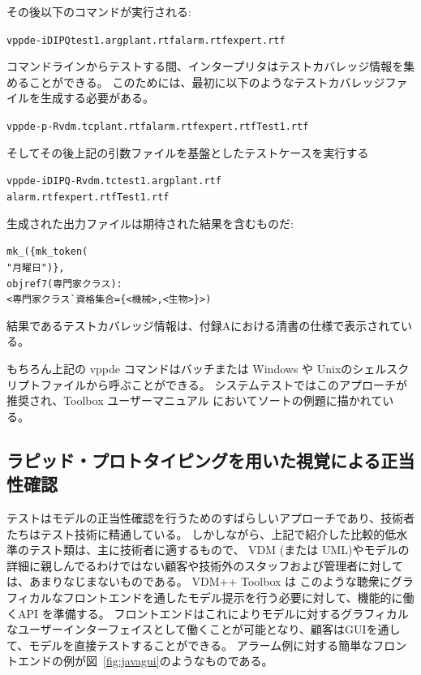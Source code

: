 \documentclass[\pformat,12pt,twoside]{jarticle}
\begin{document}
その後以下のコマンドが実行される: 

\small
\begin{alltt}
  vppde -iDIPQ test1.arg plant.rtf alarm.rtf expert.rtf
\end{alltt}
\normalsize

コマンドラインからテストする間、インタープリタはテストカバレッジ情報を集めることができる。
このためには、最初に以下のようなテストカバレッジファイルを生成する必要がある。

\small
\begin{alltt}
  vppde -p -R vdm.tc plant.rtf alarm.rtf expert.rtf Test1.rtf
\end{alltt}
\normalsize

そしてその後上記の引数ファイルを基盤としたテストケースを実行する

\small
\begin{alltt}
  vppde -iDIPQ -R vdm.tc test1.arg plant.rtf
                                   alarm.rtf expert.rtf Test1.rtf
\end{alltt}
\normalsize

生成された出力ファイルは期待された結果を含むものだ:

\small
\begin{alltt}
  mk\_( \{ mk\_token( 
   "月曜日" ) \},
   objref7(専門家クラス):
   \texttt{<} 専門家クラス\`{}資格集合 = \{ \texttt{<}機械\texttt{>},\texttt{<}生物\texttt{>} \} \texttt{>} )

\end{alltt}
\normalsize

結果であるテストカバレッジ情報は、付録Aにおける清書の仕様で表示されている。

もちろん上記の vppde コマンドはバッチまたは Windows や Unixのシェルスクリプトファイルから呼ぶことができる。
システムテストではこのアプローチが推奨され、Toolbox ユーザーマニュアル \cite{UserManPP-SCSK}においてソートの例題に描かれている。

\subsection{ラピッド・プロトタイピングを用いた視覚による正当性確認}

テストはモデルの正当性確認を行うためのすばらしいアプローチであり、技術者たちはテスト技術に精通している。
しかしながら、上記で紹介した比較的低水準のテスト類は、主に技術者に適するもので、 VDM (または UML)やモデルの詳細に親しんでるわけではない顧客や技術外のスタッフおよび管理者に対しては、あまりなじまないものである。
 VDM++ Toolbox は このような聴衆にグラフィカルなフロントエンドを通したモデル提示を行う必要に対して、機能的に働くAPI を準備する。
フロントエンドはこれによりモデルに対するグラフィカルなユーザーインターフェイスとして働くことが可能となり、顧客はGUIを通して、モデルを直接テストすることができる。
アラーム例に対する簡単なフロントエンドの例が図~\ref{fig:javagui}のようなものである。
\end{document}
